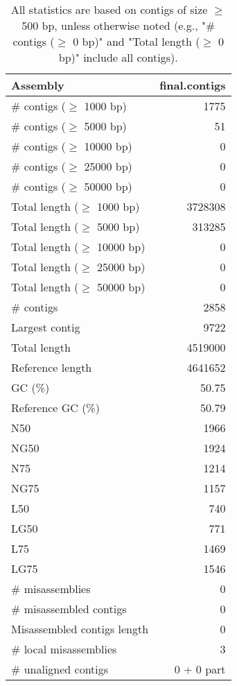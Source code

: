 \documentclass[12pt,a4paper]{article}
\begin{document}
\begin{table}[ht]
\begin{center}
\caption{All statistics are based on contigs of size $\geq$ 500 bp, unless otherwise noted (e.g., "\# contigs ($\geq$ 0 bp)" and "Total length ($\geq$ 0 bp)" include all contigs).}
\begin{tabular}{|l*{1}{|r}|}
\hline
Assembly & final.contigs \\ \hline
\# contigs ($\geq$ 1000 bp) & 1775 \\ \hline
\# contigs ($\geq$ 5000 bp) & 51 \\ \hline
\# contigs ($\geq$ 10000 bp) & 0 \\ \hline
\# contigs ($\geq$ 25000 bp) & 0 \\ \hline
\# contigs ($\geq$ 50000 bp) & 0 \\ \hline
Total length ($\geq$ 1000 bp) & 3728308 \\ \hline
Total length ($\geq$ 5000 bp) & 313285 \\ \hline
Total length ($\geq$ 10000 bp) & 0 \\ \hline
Total length ($\geq$ 25000 bp) & 0 \\ \hline
Total length ($\geq$ 50000 bp) & 0 \\ \hline
\# contigs & 2858 \\ \hline
Largest contig & 9722 \\ \hline
Total length & 4519000 \\ \hline
Reference length & 4641652 \\ \hline
GC (\%) & 50.75 \\ \hline
Reference GC (\%) & 50.79 \\ \hline
N50 & 1966 \\ \hline
NG50 & 1924 \\ \hline
N75 & 1214 \\ \hline
NG75 & 1157 \\ \hline
L50 & 740 \\ \hline
LG50 & 771 \\ \hline
L75 & 1469 \\ \hline
LG75 & 1546 \\ \hline
\# misassemblies & 0 \\ \hline
\# misassembled contigs & 0 \\ \hline
Misassembled contigs length & 0 \\ \hline
\# local misassemblies & 3 \\ \hline
\# unaligned contigs & 0 + 0 part \\ \hline

\end{tabular}
\end{center}
\end{table}
\end{document}
